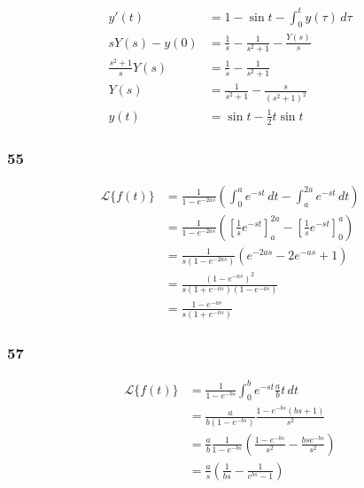 \documentclass{article}
\begin{document}
\begin{align*}
  y'(t)                  & = 1 - \sin t - \int_0^t y(\tau) \,d\tau            \\
  s Y(s) - y(0)          & = \frac{1}{s} - \frac{1}{s^2 + 1} - \frac{Y(s)}{s} \\
  \frac{s^2 + 1}{s} Y(s) & = \frac{1}{s} - \frac{1}{s^2 + 1}                  \\
  Y(s)                   & = \frac{1}{s^2 + 1} - \frac{s}{(s^2 + 1)^2}        \\
  y(t)                   & = \sin t - \frac{1}{2} t \sin t
\end{align*}

\subsubsection{55}

\begin{align*}
  \mathcal{L}\{f(t)\} & = \frac{1}{1 - e^{-2 a s}} \left( \int_0^a e^{-s t} \,dt - \int_a^{2 a} e^{-s t} \,dt \right)                                   \\
                      & = \frac{1}{1 - e^{-2 a s}} \left( \left[ \frac{1}{s} e^{-s t} \right]_a^{2 a} - \left[ \frac{1}{s} e^{-s t} \right]_0^a \right) \\
                      & = \frac{1}{s (1 - e^{-2 a s})} (e^{-2 a s} - 2 e^{-a s} + 1)                                                                    \\
                      & = \frac{(1 - e^{-a s})^2}{s (1 + e^{-a s}) (1 - e^{-a s})}                                                                      \\
                      & = \frac{1 - e^{-a s}}{s (1 + e^{-a s})}
\end{align*}

\subsubsection{57}

\begin{align*}
  \mathcal{L}\{f(t)\} & = \frac{1}{1 - e^{-b s}} \int_0^b e^{-s t} \frac{a}{b} t \,dt                                           \\
                      & = \frac{a}{b (1 - e^{-b s})} \frac{1 - e^{-b s} (b s + 1)}{s^2}                                         \\
                      & = \frac{a}{b} \frac{1}{1 - e^{-b s}} \left( \frac{1 - e^{-b s}}{s^2} - \frac{b s e^{-b s}}{s^2} \right) \\
                      & = \frac{a}{s} \left( \frac{1}{b s} - \frac{1}{e^{b s} - 1} \right)                                      \\
\end{align*}
\end{document}
